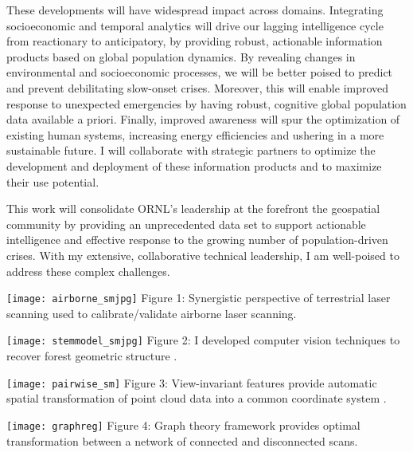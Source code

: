 \documentclass[letterpaper,sans]{moderncv}
\begin{document}
\begin{paracol}{2}
\begin{leftcolumn}
These developments will have widespread impact across domains. Integrating socioeconomic and temporal analytics will drive our lagging intelligence cycle from reactionary to anticipatory, by providing robust, actionable information products based on global population dynamics. By revealing changes in environmental and socioeconomic processes, we will be better poised to predict and prevent debilitating slow-onset crises. Moreover, this will enable improved response to unexpected emergencies by having robust, cognitive global population data available a priori. Finally, improved awareness will spur the optimization of existing human systems, increasing energy efficiencies and ushering in a more sustainable future. I will collaborate with strategic partners to optimize the development and deployment of these information products and to maximize their use potential. 
\vspace{.2cm}

This work will consolidate ORNL's leadership at the forefront the geospatial community by providing an unprecedented data set to support actionable intelligence and effective response to the growing number of population-driven crises. 
With my extensive, collaborative technical leadership, I am well-poised to address these complex challenges. 

\end{leftcolumn}

\begin{rightcolumn}
\vspace{6mm}

    \texttt{[image: airborne\_smjpg]}
Figure 1: Synergistic perspective of terrestrial laser scanning used to calibrate/validate airborne laser scanning.
\newline

    \texttt{[image: stemmodel\_smjpg]}
Figure 2: I developed computer vision techniques to recover forest geometric structure \cite{kelbe2015stem}.
\newline

\vspace{\baselineskip}
    \texttt{[image: pairwise\_sm]}
Figure 3: View-invariant features provide automatic spatial transformation of point cloud data into a common coordinate system \cite{sl2013dk}.
\newline

    \texttt{[image: graphreg]}
Figure 4: Graph theory framework provides optimal transformation between a network of connected and disconnected scans.
\newline


\end{rightcolumn}
\end{paracol}
\end{document}
